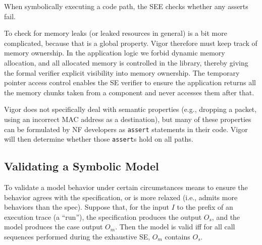 \documentclass[letterpaper,twocolumn,10pt]{article}
\newcommand{\code}[1]{\lstinline{#1}}
\begin{document}
When symbolically executing a code path, the SEE checks whether any asserts fail.

To check for memory leaks (or leaked resources in general) is a bit more complicated, because that is a global property. Vigor therefore must keep track of memory ownership. In the application logic we forbid dynamic memory allocation, and all allocated memory is controlled in the library, thereby giving the formal verifier explicit visibility into memory ownership. The temporary pointer access control enables the SE verifier to ensure the application returns all the memory chunks taken from a component and never accesses them after that.

Vigor does not specifically deal with semantic properties (e.g., dropping a packet, using an incorrect MAC address as a destination), but many of these properties can be formulated by NF developers as \code{assert} statements in their code. Vigor will then determine whether those \code{assert}s hold on all paths.

\subsection{Validating a Symbolic Model}
\label{sec:model-validation-criteria}

To validate a model behavior under certain circumstances means to ensure the behavior agrees with the specification, or is more relaxed (i.e., admits more behaviors than the spec). Suppose that, for the input \(I\) to the prefix of an execution trace (a ``run''), the specification produces the output $O_s$, and the model produces the case output \(O_m\). Then the model is valid iff for all call sequences performed during the exhaustive SE, \(O_m\) contains \(O_s\).
\end{document}
